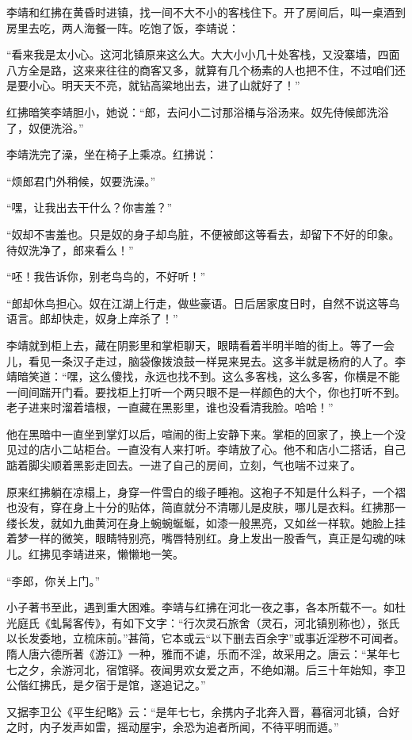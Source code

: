 李靖和红拂在黄昏时进镇，找一间不大不小的客栈住下。开了房间后，叫一桌酒到房里去吃，两人海餐一阵。吃饱了饭，李靖说：

“看来我是太小心。这河北镇原来这么大。大大小小几十处客栈，又没寨墙，四面八方全是路，这来来往往的商客又多，就算有几个杨素的人也把不住，不过咱们还是要小心。明天天不亮，就钻高粱地出去，进了山就好了！”

红拂暗笑李靖胆小，她说：“郎，去问小二讨那浴桶与浴汤来。奴先侍候郎洗浴了，奴便洗浴。”

李靖洗完了澡，坐在椅子上乘凉。红拂说：

“烦郎君门外稍候，奴要洗澡。”

“嘿，让我出去干什么？你害羞？”

“奴却不害羞也。只是奴的身子却鸟脏，不便被郎这等看去，却留下不好的印象。待奴洗净了，郎来看么！”

“呸！我告诉你，别老鸟鸟的，不好听！”

“郎却休鸟担心。奴在江湖上行走，做些豪语。日后居家度日时，自然不说这等鸟语言。郎却快走，奴身上痒杀了！”

李靖就到柜上去，藏在阴影里和掌柜聊天，眼睛看着半明半暗的街上。等了一会儿，看见一条汉子走过，脑袋像拨浪鼓一样晃来晃去。这多半就是杨府的人了。李靖暗笑道：“嘿，这么傻找，永远也找不到。这么多客栈，这么多客，你横是不能一间间踹开门看。要找柜上打听一个两只眼不是一样颜色的大个，你也打听不到。老子进来时溜着墙根，一直藏在黑影里，谁也没看清我脸。哈哈！”

他在黑暗中一直坐到掌灯以后，喧闹的街上安静下来。掌柜的回家了，换上一个没见过的店小二站柜台。一直没有人来打听。李靖放了心。他不和店小二搭话，自己踮着脚尖顺着黑影走回去。一进了自己的房间，立刻，气也喘不过来了。

原来红拂躺在凉榻上，身穿一件雪白的缎子睡袍。这袍子不知是什么料子，一个褶也没有，穿在身上十分的贴体，简直就分不清哪儿是皮肤，哪儿是衣料。红拂那一缕长发，就如九曲黄河在身上蜿蜿蜒蜒，如漆一般黑亮，又如丝一样软。她脸上挂着梦一样的微笑，眼睛特别亮，嘴唇特别红。身上发出一股香气，真正是勾魂的味儿。红拂见李靖进来，懒懒地一笑。

“李郎，你关上门。”

小子著书至此，遇到重大困难。李靖与红拂在河北一夜之事，各本所载不一。如杜光庭氏《虬髯客传》，有如下文字：“行次灵石旅舍（灵石，河北镇别称也），张氏以长发委地，立梳床前。”甚简，它本或云“以下删去百余字”或事近淫秽不可闻者。隋人唐六德所著《游江》一种，雅而不谑，乐而不淫，故采用之。唐云：“某年七七之夕，余游河北，宿馆驿。夜闻男欢女爱之声，不绝如潮。后三十年始知，李卫公偕红拂氏，是夕宿于是馆，遂追记之。”

又据李卫公《平生纪略》云：“是年七七，余携内子北奔入晋，暮宿河北镇，合好之时，内子发声如雷，摇动屋宇，余恐为追者所闻，不待平明而遁。”

